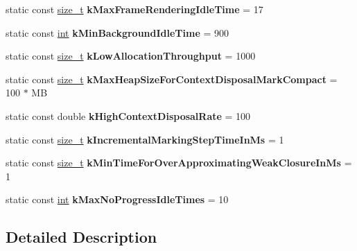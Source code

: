 \begin{DoxyCompactItemize}
static const \mbox{\hyperlink{classsize__t}{size\+\_\+t}} {\bfseries k\+Max\+Frame\+Rendering\+Idle\+Time} = 17
\item 
\mbox{\label{classv8_1_1internal_1_1GCIdleTimeHandler_abdc12dafbcc66a3a57efa094daca06d2}} 
static const \mbox{\hyperlink{classint}{int}} {\bfseries k\+Min\+Background\+Idle\+Time} = 900
\item 
\mbox{\label{classv8_1_1internal_1_1GCIdleTimeHandler_ae25eb6e8a6a10ee5097ffff5671d3466}} 
static const \mbox{\hyperlink{classsize__t}{size\+\_\+t}} {\bfseries k\+Low\+Allocation\+Throughput} = 1000
\item 
\mbox{\label{classv8_1_1internal_1_1GCIdleTimeHandler_a01e76c5e23b24447c1e81abf0f87e682}} 
static const \mbox{\hyperlink{classsize__t}{size\+\_\+t}} {\bfseries k\+Max\+Heap\+Size\+For\+Context\+Disposal\+Mark\+Compact} = 100 $\ast$ MB
\item 
\mbox{\label{classv8_1_1internal_1_1GCIdleTimeHandler_aefba3e232d4ec9128c842b2a8a4a5d79}} 
static const double {\bfseries k\+High\+Context\+Disposal\+Rate} = 100
\item 
\mbox{\label{classv8_1_1internal_1_1GCIdleTimeHandler_a1ef856d1b7e95aea63f0d8e7d46103a3}} 
static const \mbox{\hyperlink{classsize__t}{size\+\_\+t}} {\bfseries k\+Incremental\+Marking\+Step\+Time\+In\+Ms} = 1
\item 
\mbox{\label{classv8_1_1internal_1_1GCIdleTimeHandler_a859f061e71f359aee16b3184f000ac02}} 
static const \mbox{\hyperlink{classsize__t}{size\+\_\+t}} {\bfseries k\+Min\+Time\+For\+Over\+Approximating\+Weak\+Closure\+In\+Ms} = 1
\item 
\mbox{\label{classv8_1_1internal_1_1GCIdleTimeHandler_aa1b3ce52d5e1bb25dbf76107cb5a7e12}} 
static const \mbox{\hyperlink{classint}{int}} {\bfseries k\+Max\+No\+Progress\+Idle\+Times} = 10
\end{DoxyCompactItemize}


\subsection{Detailed Description}


